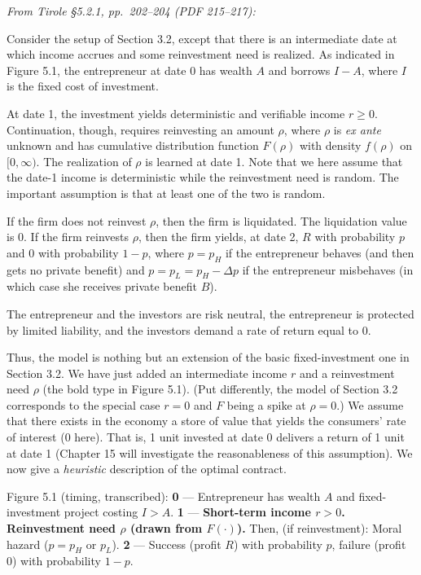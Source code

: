 \documentclass[11pt,a4paper]{article}
\begin{document}
\emph{From Tirole §5.2.1, pp.~202--204 (PDF 215--217):}

Consider the setup of Section 3.2, except that there is an intermediate date at which income accrues
and some reinvestment need is realized. As indicated in Figure 5.1, the entrepreneur at date 0 has
wealth \(A\) and borrows \(I - A\), where \(I\) is the fixed cost of investment.

At date 1, the investment yields deterministic and verifiable income \(r \geqslant 0\).
Continuation, though, requires reinvesting an amount \(\rho\), where \(\rho\) is \emph{ex ante}
unknown and has cumulative distribution function \(F(\rho)\) with density \(f(\rho)\) on
\([0, \infty)\). The realization of \(\rho\) is learned at date 1. Note that we here assume that the
date-1 income is deterministic while the reinvestment need is random. The important assumption is
that at least one of the two is random.

If the firm does not reinvest \(\rho\), then the firm is liquidated. The liquidation value is 0. If
the firm reinvests \(\rho\), then the firm yields, at date 2, \(R\) with probability \(p\) and 0
with probability \(1 - p\), where \(p = p_H\) if the entrepreneur behaves (and then gets no private
benefit) and \(p = p_L = p_H - \Delta p\) if the entrepreneur misbehaves (in which case she receives
private benefit \(B\)).

The entrepreneur and the investors are risk neutral, the entrepreneur is protected by limited
liability, and the investors demand a rate of return equal to 0.

Thus, the model is nothing but an extension of the basic fixed-investment one in Section 3.2. We
have just added an intermediate income \(r\) and a reinvestment need \(\rho\) (the bold type in
Figure 5.1). (Put differently, the model of Section 3.2 corresponds to the special case \(r = 0\)
and \(F\) being a spike at \(\rho = 0\).) We assume that there exists in the economy a store of
value that yields the consumers' rate of interest (0 here). That is, 1 unit invested at date 0
delivers a return of 1 unit at date 1 (Chapter 15 will investigate the reasonableness of this
assumption). We now give a \emph{heuristic} description of the optimal contract.

Figure 5.1 (timing, transcribed): \textbf{0} --- Entrepreneur has wealth \(A\) and fixed-investment
project costing \(I > A\). \textbf{1} --- \textbf{Short-term income \(r > 0\). Reinvestment need
\(\rho\) (drawn from \(F(\cdot)\)).} Then, (if reinvestment): Moral hazard (\(p = p_H\) or \(p_L\)).
\textbf{2} --- Success (profit \(R\)) with probability \(p\), failure (profit 0) with probability
\(1 - p\).
\end{document}
